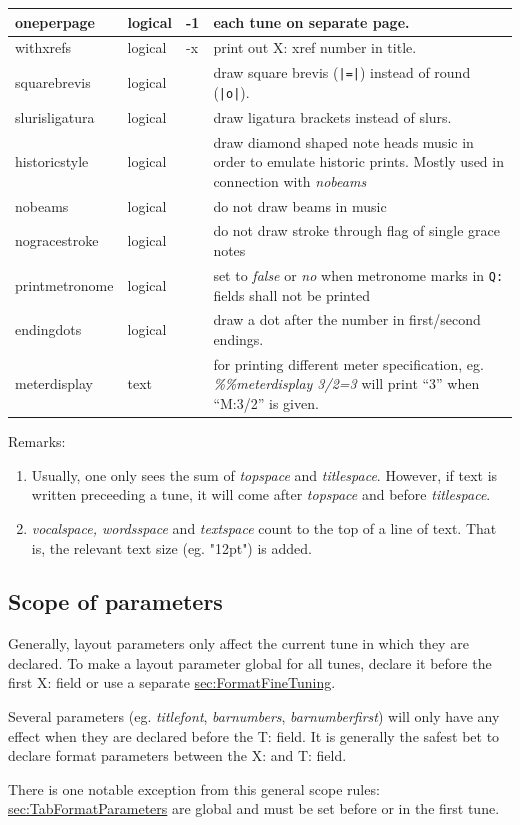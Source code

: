 \documentclass[a4paper]{article}
\begin{document}
\begin{center}
\begin{longtable}{|l|l|p{1.8cm}|p{7.2cm}|}
oneperpage & logical & -1 & 
	each tune on separate page. \\ \hline
withxrefs & logical & -x & 
	print out X: xref number in title. \\ \hline
squarebrevis & logical & & 
	draw square brevis (\verb$|=|$) instead of round (\verb$|o|$). \\ \hline
slurisligatura & logical & & 
	draw ligatura brackets instead of slurs. \\ \hline
historicstyle & logical & & 
	draw diamond shaped note heads music in order to emulate historic prints.
	Mostly used in connection with {\it nobeams} \\ \hline
nobeams & logical & & 
	do not draw beams in music \\ \hline
nogracestroke & logical & & 
	do not draw stroke through flag of single grace notes \\ \hline
printmetronome & logical & & 
	set to {\it false} or {\it no} when metronome marks in {\tt Q:} fields
	shall not be printed \\ \hline
endingdots & logical & & 
	draw a dot after the number in first/second endings. \\ \hline
meterdisplay & text & &
	for printing different meter specification, eg. {\it \%\%meterdisplay
	3/2=3} will print ``3'' when ``M:3/2'' is given. \\ \hline
\end{longtable}
\end{center}

Remarks:
\begin{enumerate}
\item Usually, one only sees the sum of {\it topspace} and 
{\it titlespace}. However, if text is written preceeding a tune, it
will come after {\it topspace} and before {\it titlespace}.
\item {\it vocalspace, wordsspace} and {\it textspace} count to the top 
of a line of text. That is, the relevant text size (eg. "12pt") is added.
\end{enumerate}

\subsection{Scope of parameters}
Generally, layout parameters only affect the current tune in which
they are declared. To make a layout parameter global for all tunes,
declare it before the first X: field or use a separate 
\hyperref{format file}{(see beginning of section }{)}{sec:FormatFineTuning}.
\par
Several parameters (eg. {\it titlefont}, {\it barnumbers},
{\it barnumberfirst}) will only have any effect when they are
declared before the T: field. It is generally the safest
bet to declare format parameters between the X: and T: field.
\par
There is one notable exception from this general scope rules:
\hyperref{tablature font settings}{tablature font settings (see section }{)}{sec:TabFormatParameters}
are global and must be set before or in the first tune.
\end{document}
